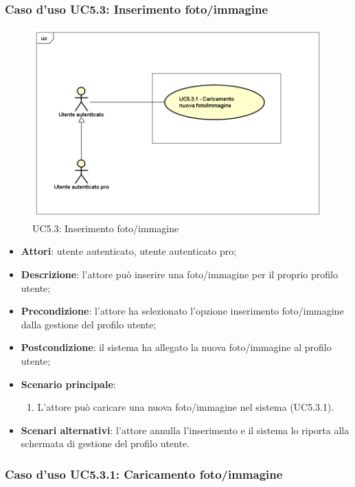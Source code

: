 \subsubsection{Caso d'uso UC5.3: Inserimento foto/immagine}
\label{UC5.3}
\begin{figure}[h]
	\centering
	\includegraphics[scale=0.5,keepaspectratio]{UML/UC5_3.png}
	\caption{UC5.3: Inserimento foto/immagine}
\end{figure}
\begin{itemize}
	\item \textbf{Attori}: utente autenticato, utente autenticato pro;
	\item \textbf{Descrizione}: l'attore può inserire una foto/immagine per il proprio profilo utente;
	\item \textbf{Precondizione}: l'attore ha selezionato l'opzione inserimento foto/immagine dalla gestione del profilo utente; 
	\item \textbf{Postcondizione}: il sistema ha allegato la nuova foto/immagine al profilo utente;
	\item \textbf{Scenario principale}:
	\begin{enumerate}
		\item L'attore può caricare una nuova foto/immagine nel sistema (UC5.3.1).
	\end{enumerate}
	\item \textbf{Scenari alternativi}: l'attore annulla l'inserimento e il sistema lo riporta alla schermata di gestione del profilo utente.
\end{itemize}

\subsubsection{Caso d'uso UC5.3.1: Caricamento foto/immagine}

